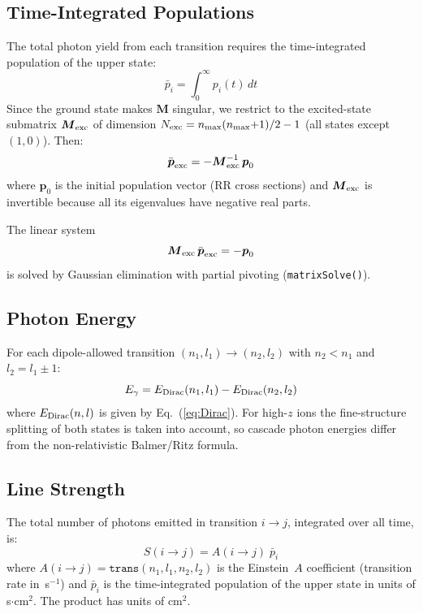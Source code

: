 \documentclass[11pt,a4paper]{article}
\newcommand{\bM}{\boldsymbol{M}}
\newcommand{\bp}{\boldsymbol{p}}
\begin{document}
\subsection{Time-Integrated Populations}

The total photon yield from each transition requires the time-integrated
population of the upper state:
\begin{equation}
  \bar{p}_i = \int_0^\infty p_i(t)\, dt
  \label{eq:pb}
\end{equation}
Since the ground state makes $\bM$ singular, we restrict to the
excited-state submatrix $\bM_{\rm exc}$ of dimension
$N_{\rm exc} = n_{\rm max}(n_{\rm max}{+}1)/2 - 1$ (all states except
$(1,0)$).  Then:
\begin{equation}
  \bar{\bp}_{\rm exc} = -\bM_{\rm exc}^{-1}\, \bp_0
  \label{eq:barp}
\end{equation}
where $\bp_0$ is the initial population vector (RR cross sections) and
$\bM_{\rm exc}$ is invertible because all its eigenvalues have negative
real parts.

The linear system
\begin{equation}
  \bM_{\rm exc}\, \bar{\bp}_{\rm exc} = -\bp_0
  \label{eq:lin}
\end{equation}
is solved by Gaussian elimination with partial pivoting
(\texttt{matrixSolve()}).

\subsection{Photon Energy}

For each dipole-allowed transition $(n_1,l_1) \to (n_2,l_2)$ with
$n_2 < n_1$ and $l_2 = l_1 \pm 1$:
\begin{equation}
  E_{\gamma} = E_{\rm Dirac}(n_1,l_1) - E_{\rm Dirac}(n_2,l_2)
  \label{eq:Ecasc}
\end{equation}
where $E_{\rm Dirac}(n,l)$ is given by Eq.~(\ref{eq:Dirac}).  For
high-$z$ ions the fine-structure splitting of both states is taken into
account, so cascade photon energies differ from the non-relativistic
Balmer/Ritz formula.

\subsection{Line Strength}

The total number of photons emitted in transition $i \to j$,
integrated over all time, is:
\begin{equation}
  S(i \to j) = A(i \to j)\; \bar{p}_i
  \label{eq:Scasc}
\end{equation}
where $A(i \to j) = \texttt{trans}(n_1,l_1,n_2,l_2)$ is the
Einstein~$A$ coefficient (transition rate in~s$^{-1}$) and
$\bar{p}_i$ is the time-integrated population of the upper state in
units of s$\cdot$cm$^2$.  The product has units of cm$^2$.
\end{document}
